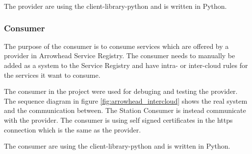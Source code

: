 The provider are using the client-library-python and is written in Python. 

\subsubsection{Consumer}
The purpose of the consumer is to consume services which are offered by a provider in Arrowhead Service Registry. 
The consumer needs to manually be added as a system to the Service Registry and have intra- or inter-cloud rules for the services it want to consume.
  
The consumer in the project were used for debuging and testing the provider. The sequence diagram in figure \ref{fig:arrowhead_intercloud} shows the real system and the communication between. The Station Consumer is instead communicate with the provider. 
The consumer is using self signed certificates in the https connection which is the same as the provider. 

The consumer are using the client-library-python and is written in Python.

